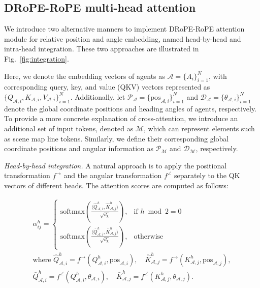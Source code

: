 \documentclass[lettersize,journal]{IEEEtran}
\theoremstyle{definition}
\begin{document}
\subsection{DRoPE-RoPE multi-head attention}
\label{sec:drope_rope}

We introduce two alternative manners to implement DRoPE-RoPE attention module for relative position and angle embedding, named head-by-head and intra-head integration. These two approaches are illustrated in Fig.~\ref{fig:integration}.

Here, we denote the embedding vectors of agents as \(\mathcal{A}=\{A_i\}_{i=1}^N\), with corresponding query, key, and value (QKV) vectors represented as \(\{Q_{\mathcal{A},i}, K_{\mathcal{A},i}, V_{\mathcal{A},i}\}_{i=1}^{N}\). Additionally, let \(\mathcal{P}_\mathcal{A}=\{\text{pos}_{\mathcal{A},i}\}_{i=1}^N\) and \(\mathcal{D}_\mathcal{A}=\{\theta_{\mathcal{A},i}\}_{i=1}^N\) denote the global coordinate positions and heading angles of agents, respectively.
To provide a more concrete explanation of cross-attention, we introduce an additional set of input tokens, denoted as \(\mathcal{M}\), which can represent elements such as scene map line tokens. Similarly, we define their corresponding global coordinate positions and angular information as \(\mathcal{P}_\mathcal{M}\) and \(\mathcal{D}_\mathcal{M}\), respectively.

\noindent\textit{Head-by-head integration.} \quad 
A natural approach is to apply the positional transformation \( f^{\rightarrow} \) and the angular transformation \( f^\angle \) separately to the QK vectors of different heads. The attention scores are computed as follows:

\begin{gather}
\alpha_{ij}^h =
\begin{cases}
\mathrm{softmax} \left(
  \frac{ \langle \hat{Q}_{\mathcal{A},i}^h, \hat{K}_{\mathcal{A},j}^h \rangle}{\sqrt{d_k}}
\right), & \text{if } h \bmod 2 = 0 \\[10pt]
\mathrm{softmax} \left(
  \frac{ \langle \bar{Q}_{\mathcal{A},i}^{h}, \bar{K}_{\mathcal{A},j}^{h} \rangle}{\sqrt{d_k}}
\right), & \text{otherwise}
\end{cases} \\
\text{where }
\hat{Q}^h_{\mathcal{A},i} = f^{\rightarrow}(Q_{\mathcal{A},i}^h, \text{pos}_{\mathcal{A},i}), \quad \hat{K}^{h}_{\mathcal{A},j} = f^{\rightarrow}(K_{\mathcal{A},j}^h, \text{pos}_{\mathcal{A},j}), \\[5pt]
\bar{Q}^{h}_{\mathcal{A},i} = f^\angle(Q_{\mathcal{A},i}^h, \theta_{\mathcal{A},i}), \quad \bar{K}^{h}_{\mathcal{A},j} = f^\angle(K_{\mathcal{A},j}^h, \theta_{\mathcal{A},j}).
\end{gather}
\end{document}
